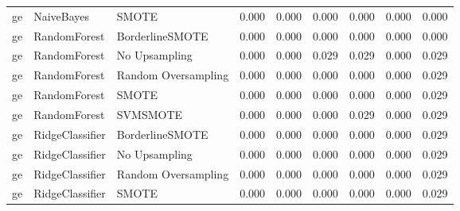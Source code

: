 \begin{tabular}{lllllllll}
      ge &                      NaiveBayes &                         SMOTE &     0.000 &                     0.000 &                 0.000 &                  0.000 &                                   0.000 &     0.000 \\
      ge &                    RandomForest &               BorderlineSMOTE &     0.000 &                     0.000 &                 0.000 &                  0.000 &                                   0.000 &     0.000 \\
      ge &                    RandomForest &                 No Upsampling &     0.000 &                     0.000 &                 0.029 &                  0.029 &                                   0.000 &     0.029 \\
      ge &                    RandomForest &           Random Oversampling &     0.000 &                     0.000 &                 0.000 &                  0.000 &                                   0.000 &     0.029 \\
      ge &                    RandomForest &                         SMOTE &     0.000 &                     0.000 &                 0.000 &                  0.000 &                                   0.000 &     0.029 \\
      ge &                    RandomForest &                      SVMSMOTE &     0.000 &                     0.000 &                 0.000 &                  0.029 &                                   0.000 &     0.029 \\
      ge &                 RidgeClassifier &               BorderlineSMOTE &     0.000 &                     0.000 &                 0.000 &                  0.000 &                                   0.000 &     0.029 \\
      ge &                 RidgeClassifier &                 No Upsampling &     0.000 &                     0.000 &                 0.000 &                  0.000 &                                   0.000 &     0.029 \\
      ge &                 RidgeClassifier &           Random Oversampling &     0.000 &                     0.000 &                 0.000 &                  0.000 &                                   0.000 &     0.029 \\
      ge &                 RidgeClassifier &                         SMOTE &     0.000 &                     0.000 &                 0.000 &                  0.000 &                                   0.000 &     0.029 \\

\end{tabular}
